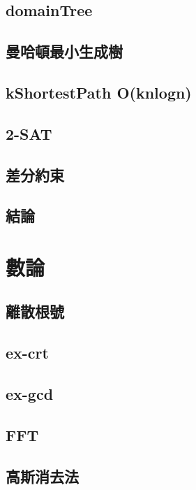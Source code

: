 \documentclass[a4paper,10pt,twocolumn,oneside]{article}
\begin{document}
\subsection{domainTree} 

\subsection{曼哈頓最小生成樹}

\subsection{kShortestPath O(knlogn)}

\subsection{2-SAT}

\subsection{差分約束}

\subsection{結論}

\section{數論}
\subsection{離散根號}

\subsection{ex-crt}

\subsection{ex-gcd}

\subsection{FFT}

\subsection{高斯消去法}

\end{document}
